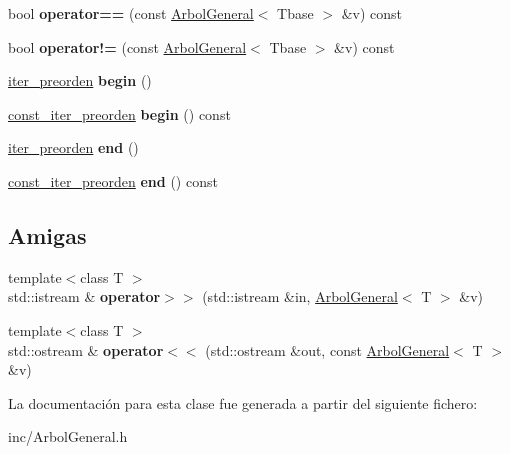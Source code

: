 \begin{DoxyCompactItemize}
\item 
bool {\bfseries operator==} (const \hyperlink{class_arbol_general}{Arbol\+General}$<$ Tbase $>$ \&v) const \hypertarget{class_arbol_general_a5c7db1c3f26d29b887ba906d02397a8d}{}\label{class_arbol_general_a5c7db1c3f26d29b887ba906d02397a8d}

\item 
bool {\bfseries operator!=} (const \hyperlink{class_arbol_general}{Arbol\+General}$<$ Tbase $>$ \&v) const \hypertarget{class_arbol_general_ab5b783cb068a394511f99e08a827cdda}{}\label{class_arbol_general_ab5b783cb068a394511f99e08a827cdda}

\item 
\hyperlink{class_arbol_general_1_1iter__preorden}{iter\+\_\+preorden} {\bfseries begin} ()\hypertarget{class_arbol_general_afbaa00d73656de3957e6f0427ba53347}{}\label{class_arbol_general_afbaa00d73656de3957e6f0427ba53347}

\item 
\hyperlink{class_arbol_general_1_1const__iter__preorden}{const\+\_\+iter\+\_\+preorden} {\bfseries begin} () const \hypertarget{class_arbol_general_a63912c2167da4335982ea59948404d4a}{}\label{class_arbol_general_a63912c2167da4335982ea59948404d4a}

\item 
\hyperlink{class_arbol_general_1_1iter__preorden}{iter\+\_\+preorden} {\bfseries end} ()\hypertarget{class_arbol_general_a7d6434353f5d55acf8c22226838da586}{}\label{class_arbol_general_a7d6434353f5d55acf8c22226838da586}

\item 
\hyperlink{class_arbol_general_1_1const__iter__preorden}{const\+\_\+iter\+\_\+preorden} {\bfseries end} () const \hypertarget{class_arbol_general_a457b326a6347bb4d9b1cf6a062b32988}{}\label{class_arbol_general_a457b326a6347bb4d9b1cf6a062b32988}

\end{DoxyCompactItemize}
\subsection*{Amigas}
\begin{DoxyCompactItemize}
\item 
{\footnotesize template$<$class T $>$ }\\std\+::istream \& {\bfseries operator$>$$>$} (std\+::istream \&in, \hyperlink{class_arbol_general}{Arbol\+General}$<$ T $>$ \&v)\hypertarget{class_arbol_general_ab1318141f030856da7dcfc1c7a162565}{}\label{class_arbol_general_ab1318141f030856da7dcfc1c7a162565}

\item 
{\footnotesize template$<$class T $>$ }\\std\+::ostream \& {\bfseries operator$<$$<$} (std\+::ostream \&out, const \hyperlink{class_arbol_general}{Arbol\+General}$<$ T $>$ \&v)\hypertarget{class_arbol_general_a4e1153e673608d812c48de2a33bbead0}{}\label{class_arbol_general_a4e1153e673608d812c48de2a33bbead0}

\end{DoxyCompactItemize}


La documentación para esta clase fue generada a partir del siguiente fichero\+:\begin{DoxyCompactItemize}
\item 
inc/Arbol\+General.\+h\end{DoxyCompactItemize}
